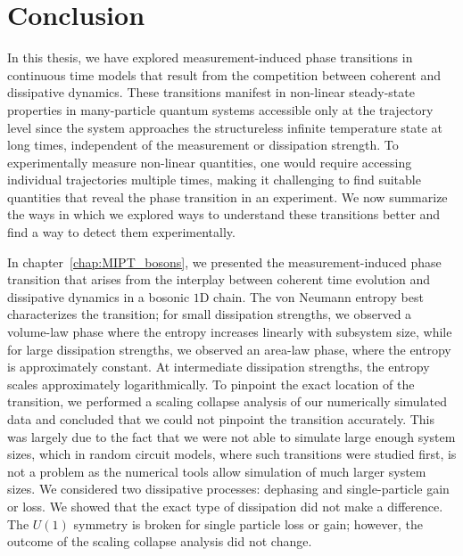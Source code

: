 \chapter{Conclusion}
\thispagestyle{empty}
\label{chap:conclusion}

In this thesis, we have explored measurement-induced phase transitions in continuous time models that result from the competition between coherent and dissipative dynamics. These transitions manifest in non-linear steady-state properties in many-particle quantum systems accessible only at the trajectory level since the system approaches the structureless infinite temperature state at long times, independent of the measurement or dissipation strength. To experimentally measure non-linear quantities, one would require accessing individual trajectories multiple times, making it challenging to find suitable quantities that reveal the phase transition in an experiment. We now summarize the ways in which we explored ways to understand these transitions better and find a way to detect them experimentally. 

In chapter~\ref{chap:MIPT_bosons}, we presented the measurement-induced phase transition that arises from the interplay between coherent time evolution and dissipative dynamics in a bosonic $1$D chain. The von Neumann entropy best characterizes the transition; for small dissipation strengths, we observed a volume-law phase where the entropy increases linearly with subsystem size, while for large dissipation strengths, we observed an area-law phase, where the entropy is approximately constant. At intermediate dissipation strengths, the entropy scales approximately logarithmically. To pinpoint the exact location of the transition, we performed a scaling collapse analysis of our numerically simulated data and concluded that we could not pinpoint the transition accurately. This was largely due to the fact that we were not able to simulate large enough system sizes, which in random circuit models, where such transitions were studied first, is not a problem as the numerical tools allow simulation of much larger system sizes. We considered two dissipative processes: dephasing and single-particle gain or loss. We showed that the exact type of dissipation did not make a difference. The $U(1)$ symmetry is broken for single particle loss or gain; however, the outcome of the scaling collapse analysis did not change. 

